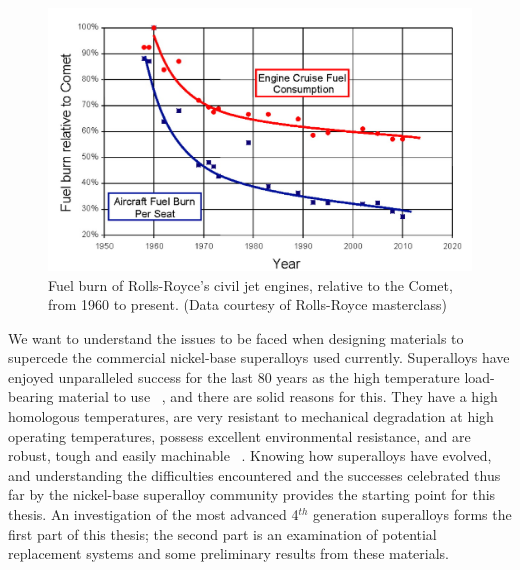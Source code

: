 \begin{figure}[htbp]
\begin{center}
\includegraphics{FuelBurn}
\caption{Fuel burn of Rolls-Royce's civil jet engines, relative to the Comet, from 1960 to present. (Data courtesy of Rolls-Royce masterclass)}\label{fig:FuelBurn}
\end{center}
\end{figure}
%

We want to understand the issues to be faced when designing materials to supercede the commercial nickel-base superalloys used currently. Superalloys have enjoyed unparalleled success for the last 80 years as the high temperature load-bearing material to use ~\cite{reed06}, and there are solid reasons for this. They have a high homologous temperatures, are very resistant to mechanical degradation at high operating temperatures, possess excellent environmental resistance, and are robust, tough and easily machinable ~\cite{betteridge87, sims87}. Knowing how superalloys have evolved, and understanding the difficulties encountered and the successes celebrated thus far by the nickel-base superalloy community provides the starting point for this thesis. An investigation of the most advanced 4$^{th}$ generation superalloys forms the first part of this thesis; the second part is an examination of potential replacement systems and some preliminary results from these materials. 


